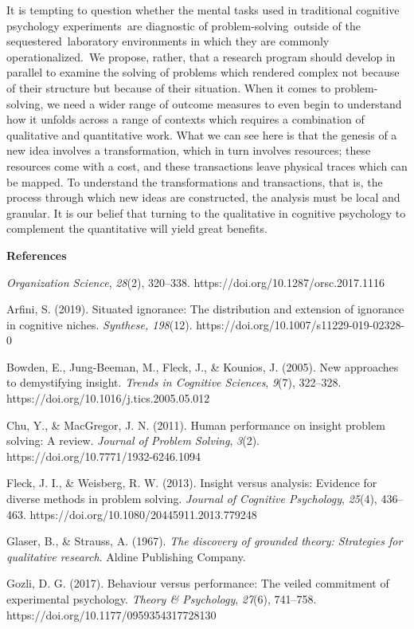 \documentclass{article}
\begin{document}
It is tempting to question whether the mental tasks used in traditional cognitive psychology experiments are diagnostic of problem-solving outside of the sequestered laboratory environments in which they are commonly operationalized. We propose, rather, that a research program should develop in parallel to examine the solving of problems which rendered complex not because of their structure but because of their situation. When it comes to problem-solving, we need a wider range of outcome measures to even begin to understand how it unfolds across a range of contexts which requires a combination of qualitative and quantitative work. What we can see here is that the genesis of a new idea involves a transformation, which in turn involves resources; these resources come with a cost, and these transactions leave physical traces which can be mapped. To understand the transformations and transactions, that is, the process through which new ideas are constructed, the analysis must be local and granular. It is our belief that turning to the qualitative in cognitive psychology to complement the quantitative will yield great benefits.

\textbf{}

\textbf{References}

\emph{Organization Science}, \emph{28}(2), 320--338. https://doi.org/10.1287/orsc.2017.1116

Arfini, S. (2019). Situated ignorance: The distribution and extension of ignorance in cognitive niches. \emph{Synthese, 198}(12). https://doi.org/10.1007/s11229-019-02328-0

Bowden, E., Jung-Beeman, M., Fleck, J., \& Kounios, J. (2005). New approaches to demystifying insight. \emph{Trends in Cognitive Sciences}, \emph{9}(7), 322--328. https://doi.org/10.1016/j.tics.2005.05.012

Chu, Y., \& MacGregor, J. N. (2011). Human performance on insight problem solving: A review. \emph{Journal of Problem Solving}, \emph{3}(2). https://doi.org/10.7771/1932-6246.1094

Fleck, J. I., \& Weisberg, R. W. (2013). Insight versus analysis: Evidence for diverse methods in problem solving. \emph{Journal of Cognitive Psychology}, \emph{25}(4), 436--463. https://doi.org/10.1080/20445911.2013.779248

Glaser, B., \& Strauss, A. (1967). \emph{The discovery of grounded theory: Strategies for qualitative research}. Aldine Publishing Company.

Gozli, D. G. (2017). Behaviour versus performance: The veiled commitment of experimental psychology. \emph{Theory \& Psychology}, \emph{27}(6), 741--758. https://doi.org/10.1177/0959354317728130
\end{document}
